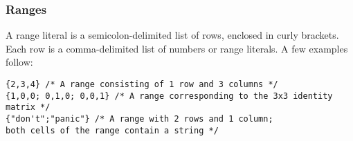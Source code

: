 \subsubsection{Ranges}
		A range literal is a semicolon-delimited list of rows, enclosed in curly brackets. Each row is a comma-delimited list of numbers or range literals. A few examples follow: 

\begin{lstlisting}
{2,3,4} /* A range consisting of 1 row and 3 columns */
{1,0,0; 0,1,0; 0,0,1} /* A range corresponding to the 3x3 identity matrix */
{"don't";"panic"} /* A range with 2 rows and 1 column; 
both cells of the range contain a string */
\end{lstlisting}
